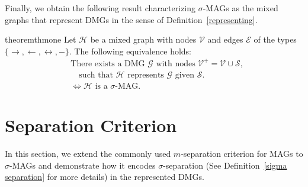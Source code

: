 \documentclass[accepted]{uai2025} %
\newcommand{\huh}{\mathrel{\leftrightarrow}}
\begin{document}
Finally, we obtain the following result characterizing $\sigma$-MAGs as the mixed graphs that represent DMGs in the sense of Definition~\ref{representing}.

\begin{restatable}{theorem}{thmone} \label{thm1}
Let \( \mathcal{H} \) be a mixed graph with nodes \( \mathcal{V} \) and edges \( \mathcal{E} \) of the types \(\{\rightarrow, \leftarrow, \huh , -\}\). The following equivalence holds:  
\[
\begin{aligned}
&\text{There exists a DMG }\mathcal{G} \text{ with nodes } \mathcal{V}^+ = \mathcal{V} \cup \mathcal{S}, \\
&\quad \text{such that } \mathcal{H} \text{ represents } \mathcal{G} \text{ given }\mathcal{S}. \\
&\iff \mathcal{H} \text{ is a } \sigma\text{-MAG}.
\end{aligned}
\]
\end{restatable}







\section{Separation Criterion} \label{section:2}
In this section, we extend the commonly used $m$-separation criterion for MAGs \citep{richardson2002ancestral} to $\sigma$-MAGs and demonstrate how it encodes $\sigma$-separation (See Definition~\ref{sigma separation} for more details) in the represented DMGs.
\end{document}
